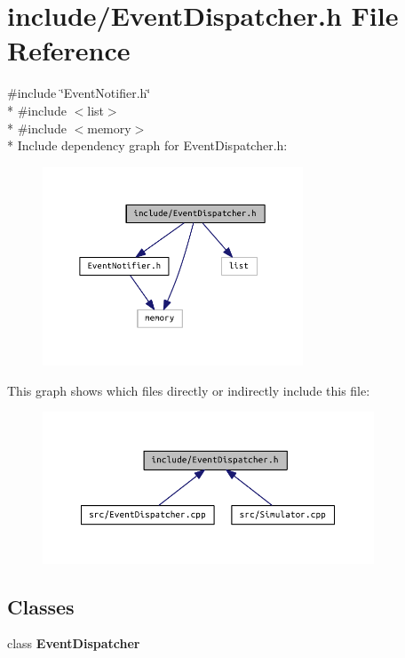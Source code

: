 \section{include/\+Event\+Dispatcher.h File Reference}
\label{_event_dispatcher_8h}
{\ttfamily \#include \char`\"{}Event\+Notifier.\+h\char`\"{}}\\*
{\ttfamily \#include $<$list$>$}\\*
{\ttfamily \#include $<$memory$>$}\\*
Include dependency graph for Event\+Dispatcher.\+h\+:
\nopagebreak
\begin{figure}[H]
\begin{center}
\leavevmode
\includegraphics[width=220pt]{_event_dispatcher_8h__incl}
\end{center}
\end{figure}
This graph shows which files directly or indirectly include this file\+:
\nopagebreak
\begin{figure}[H]
\begin{center}
\leavevmode
\includegraphics[width=280pt]{_event_dispatcher_8h__dep__incl}
\end{center}
\end{figure}
\subsection*{Classes}
\begin{DoxyCompactItemize}
\item 
class {\bf Event\+Dispatcher}
\end{DoxyCompactItemize}

